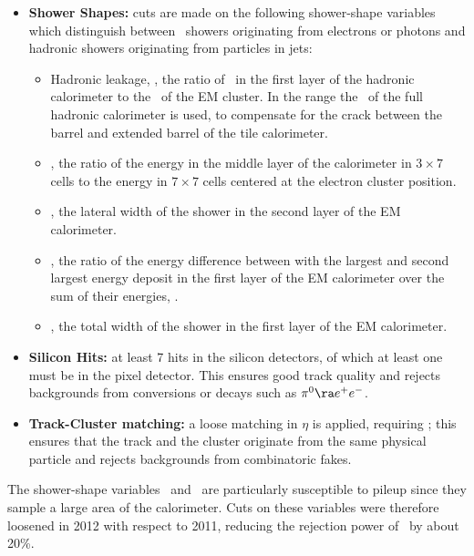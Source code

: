 \begin{itemize}

    \item {\bf Shower Shapes:} cuts are made on the following shower-shape
    variables which distinguish between \emag\ showers originating from
    electrons or photons and hadronic showers originating from particles in
    jets:

    \begin{itemize}
        \item Hadronic leakage, \Rhad, the ratio of \et\ in the first layer of
        the hadronic calorimeter to the \et\ of the EM cluster. In the range
         the \et\ of the full hadronic calorimeter is
        used, to compensate for the crack between the barrel and extended barrel
        of the tile calorimeter.
        \item \Reta, the ratio of the energy in the middle layer of the
        calorimeter in $3 \times 7$ cells to the energy in $7
        \times 7$ cells centered at the electron cluster position.
        \item \wetatwo, the lateral width of the shower in the second layer of the EM
        calorimeter.
        \item \Eratio, the ratio of the energy difference between with the largest and second
        largest energy deposit in the first layer of the EM calorimeter over the
        sum of their energies, .
        \item \wstot, the total width of the shower in the first layer of the EM
        calorimeter.
    \end{itemize}

    \item {\bf Silicon Hits:} at least 7 hits in the silicon detectors, of which at
    least one must be in the pixel detector. This ensures good track quality and
    rejects backgrounds from conversions or decays such as $\pi^{0} \ra e^{+}e^{-}$.

    \item {\bf Track-Cluster matching:} a loose matching in $\eta$ is applied,
    requiring ; this ensures that the track and the
    cluster originate from the same physical particle and rejects backgrounds
    from combinatoric fakes. 
\end{itemize}

The shower-shape variables \Reta\ and \Rhad\ are particularly susceptible to
pileup since they sample a large area of the calorimeter. Cuts on these
variables were therefore
loosened in 2012 with respect to 2011, reducing the rejection power of \loosePP\
by about 20\%.

